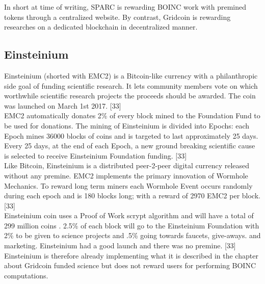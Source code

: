 In short at time of writing, SPARC is rewarding BOINC work with premined tokens through a centralized website. By contrast, Gridcoin is rewarding researches on a dedicated blockchain in decentralized manner.\\


\subsection{Einsteinium}

Einsteinium (shorted with EMC2) is a Bitcoin-like currency with a philanthropic side goal of funding scientific research. It lets community members vote on which worthwhile scientific research projects the proceeds should be awarded. The coin was launched on March 1st 2017. [33]\\


EMC2 automatically donates 2\% of every block mined to the Foundation Fund to be used for donations. The mining of Einsteinium is divided into Epochs: each Epoch mines 36000 blocks of coins and is targeted to last approximately 25 days. Every 25 days, at the end of each Epoch, a new ground breaking scientific cause is selected to receive Einsteinium Foundation funding. [33]\\

Like Bitcoin, Einsteinium is a distributed peer-2-peer digital currency released without any premine. EMC2 implements the primary innovation of Wormhole Mechanics. To reward long term miners each Wormhole Event occurs randomly during each epoch and is 180 blocks long; with a reward of 2970 EMC2 per block. [33]\\


Einsteinium coin uses a Proof of Work scrypt algorithm and will have a total of 299 million coins . 2.5\% of each block will go to the Einsteinium Foundation with 2\% to be given to science projects and .5\% going towards faucets, give-aways. and marketing. Einsteinium had a good launch and there was no premine. [33]\\
 
Einsteinium is therefore already implementing what it is described in the chapter about Gridcoin funded science but does not reward users for performing BOINC computations.
